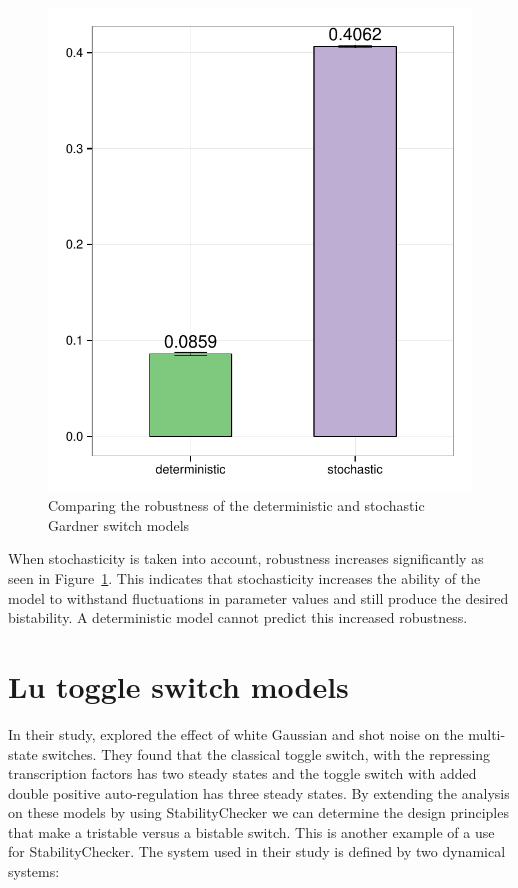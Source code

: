 \begin{figure}[h]
\centering
\includegraphics[scale=0.6]{chapterModelling/images/Gardner/wide_var/robustness_comparison.pdf}
\caption{Comparing the robustness of the deterministic and stochastic Gardner switch models}
\label{fig:Gard_robst}
\end{figure}

 When stochasticity is taken into account, robustness increases significantly as seen in Figure~\ref{fig:Gard_robst}. This indicates that stochasticity increases the ability of the model to withstand fluctuations in parameter values and still produce the desired bistability. A deterministic model cannot predict this increased robustness.


\newpage
\section{Lu toggle switch models}

In their study, \textcite{Lu:2013br} explored the effect of white Gaussian and shot noise on the multi-state switches. They found that the classical toggle switch, with the repressing transcription factors has two steady states and the toggle switch with added double positive auto-regulation has three steady states. By extending the analysis on these models by using StabilityChecker we can determine the design principles that make a tristable versus a bistable switch. This is another example of a use for StabilityChecker.
The system used in their study is defined by two dynamical systems:


